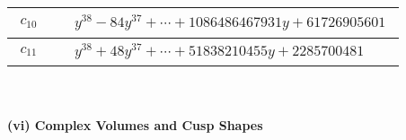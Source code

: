 \documentclass[1p]{elsarticle_modified}
\theoremstyle{definition}
\begin{document}
\begin{tabular}{m{50pt}|m{274pt}}
\hline $$\begin{aligned}c_{10}\end{aligned}$$&$\begin{aligned}
&y^{38}-84 y^{37}+\cdots+1086486467931 y+61726905601
\end{aligned}$\\
\hline $$\begin{aligned}c_{11}\end{aligned}$$&$\begin{aligned}
&y^{38}+48 y^{37}+\cdots+51838210455 y+2285700481
\end{aligned}$\\
\hline
\end{tabular}\\~\\
\newpage\flushleft \textbf{(vi) Complex Volumes and Cusp Shapes}
\end{document}
